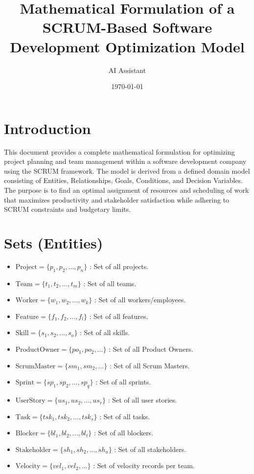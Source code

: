 \documentclass[11pt]{article}
\title{Mathematical Formulation of a SCRUM-Based Software Development Optimization Model}
\author{AI Assistant}
\date{\today}
\begin{document}
\maketitle
\tableofcontents
\newpage

\section*{Introduction}
This document provides a complete mathematical formulation for optimizing project planning and team management within a software development company using the SCRUM framework. The model is derived from a defined domain model consisting of Entities, Relationships, Goals, Conditions, and Decision Variables. The purpose is to find an optimal assignment of resources and scheduling of work that maximizes productivity and stakeholder satisfaction while adhering to SCRUM constraints and budgetary limits.

\section{Sets (Entities)}
\begin{itemize}
    \item $\text{Project} = \{p_1, p_2, ..., p_n\}$ : Set of all projects.
    \item $\text{Team} = \{t_1, t_2, ..., t_m\}$ : Set of all teams.
    \item $\text{Worker} = \{w_1, w_2, ..., w_k\}$ : Set of all workers/employees.
    \item $\text{Feature} = \{f_1, f_2, ..., f_l\}$ : Set of all features.
    \item $\text{Skill} = \{s_1, s_2, ..., s_o\}$ : Set of all skills.
    \item $\text{ProductOwner} = \{po_1, po_2, ...\}$ : Set of all Product Owners.
    \item $\text{ScrumMaster} = \{sm_1, sm_2, ...\}$ : Set of all Scrum Masters.
    \item $\text{Sprint} = \{sp_1, sp_2, ..., sp_q\}$ : Set of all sprints.
    \item $\text{UserStory} = \{us_1, us_2, ..., us_r\}$ : Set of all user stories.
    \item $\text{Task} = \{tsk_1, tsk_2, ..., tsk_s\}$ : Set of all tasks.
    \item $\text{Blocker} = \{bl_1, bl_2, ..., bl_t\}$ : Set of all blockers.
    \item $\text{Stakeholder} = \{sh_1, sh_2, ..., sh_u\}$ : Set of all stakeholders.
    \item $\text{Velocity} = \{vel_1, vel_2, ...\}$ : Set of velocity records per team.
\end{itemize}
\end{document}
